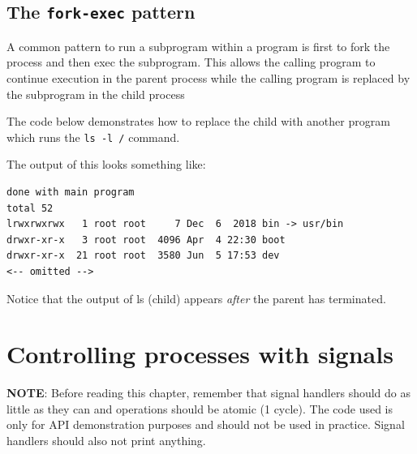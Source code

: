 \documentclass[a4paper]{article}
\begin{document}
\subsection{The \texttt{fork-exec} pattern}

A common pattern to run a subprogram within a program is first to fork the process
and then exec the subprogram. This allows the calling program to continue execution
in the parent process while the calling program is replaced by the subprogram in the child process

The code below demonstrates how to replace the child with another program which runs the \texttt{ls -l /} command.





The output of this looks something like:
\begin{verbatim}
done with main program
total 52
lrwxrwxrwx   1 root root     7 Dec  6  2018 bin -> usr/bin
drwxr-xr-x   3 root root  4096 Apr  4 22:30 boot
drwxr-xr-x  21 root root  3580 Jun  5 17:53 dev
<-- omitted -->
\end{verbatim}
Notice that the output of ls (child) appears \textit{after} the parent has terminated.



\section{Controlling processes with signals}

\textbf{NOTE}: Before reading this chapter, remember that signal handlers should do as little as they can and operations should be atomic (1 cycle). The code used is only for API demonstration purposes and should not be used in practice.  Signal handlers should also not print anything.
\end{document}
